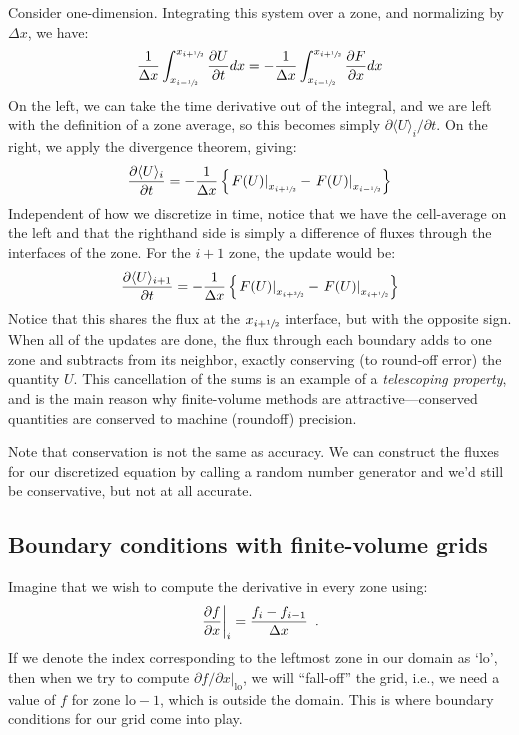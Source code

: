 Consider one-dimension.
Integrating this system over a zone, and normalizing by $\Delta x$, we have:
\begin{equation}
\frac{1}{\Delta x} \int_{x_{i-\sfrac{1}{2}}}^{x_{i+\sfrac{1}{2}}} \frac{\partial U}{\partial t} dx =
  -\frac{1}{\Delta x} \int_{x_{i-\sfrac{1}{2}}}^{x_{i+\sfrac{1}{2}}} \frac{\partial F}{\partial x} dx
\end{equation}
On the left, we can take the time derivative out of the integral, and
we are left with the definition of a zone average, so this becomes
simply $\partial \langle U\rangle_i/\partial t$.  On the right, we
apply the divergence theorem, giving:
\begin{equation}
\frac{\partial \langle U\rangle_i}{\partial t} =
  - \frac{1}{\Delta x} \left \{ \left . F(U) \right |_{x_{i+\sfrac{1}{2}}} -
                                \left . F(U) \right |_{x_{i-\sfrac{1}{2}}} \right \}
\end{equation}
Independent of how we discretize in time, notice that we have the cell-average
on the left and that the righthand side
is simply a difference of fluxes through the interfaces of the zone.
For the $i+1$ zone, the update would be:
\begin{equation}
\label{eq:consup}
\frac{\partial \langle U\rangle_{i+1}}{\partial t} =
  - \frac{1}{\Delta x} \left \{ \left . F(U) \right |_{x_{i+\sfrac{3}{2}}} -
                                \left . F(U) \right |_{x_{i+\sfrac{1}{2}}} \right \}
\end{equation}
Notice that this shares the flux at the $x_{i+\sfrac{1}{2}}$ interface, but with the
opposite sign.   When all of the updates are done, the flux through each
boundary adds to one zone and subtracts from its neighbor, exactly conserving
(to round-off error) the quantity $U$.  This cancellation of the sums
is an example of a {\em telescoping property}, and is the main reason
why finite-volume methods are attractive---conserved quantities are
conserved to machine (roundoff) precision.

Note that conservation is not the same as accuracy.  We can construct
the fluxes for our discretized equation by calling a random number
generator and we'd still be conservative, but not at all accurate.

\subsection{Boundary conditions with finite-volume grids}

Imagine that we wish to compute the derivative in every zone using:
\begin{equation}
\left . \frac{\partial f}{\partial x} \right |_i = \frac{f_i - f_{i-1}}{\Delta x} \enskip .
\label{eq:onesideddiff}
\end{equation}
If we denote the index corresponding to the leftmost zone in our
domain as `lo', then when we try to compute ${\partial f}/{\partial x}
|_\mathrm{lo}$, we will ``fall-off'' the grid, i.e., we need a value
of $f$ for zone $\mathrm{lo}-1$, which is outside the domain.  This is
where boundary conditions for our grid come into play.

